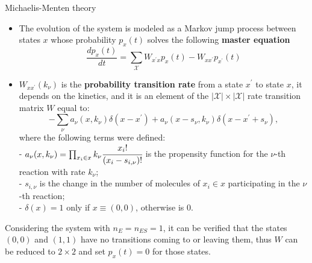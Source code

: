 \documentclass[final]{beamer}
\newlength{\colwidth}
\begin{document}
\begin{frame}[t]
\begin{columns}[t]
\begin{column}{\colwidth}
\begin{block}{Michaelis-Menten theory}
\begin{itemize}
\justifying
\item The evolution of the system is modeled as a Markov jump process between states $x$ whose probability $p_x(t)$ solves the following {\bf master equation}\cite{van2007stochastic,GILLESPIE1976403}
%
\begin{equation}
\frac{dp_{x}(t)}{dt} = \sum_{\mathcal{X}} W_{x^\prime x} p_{x}(t) -  W_{x x^\prime}p_{x^\prime}(t) \label{eq CME}
\end{equation}
\item $W_{x x^\prime }(k_\nu)$ is the {\bf probability transition rate} from a state $x^\prime$ to state $x$, it depends on the kinetics, and it is an element of the $|\mathcal{X}|\times|\mathcal{X}|$ rate transition matrix $W$ equal to\cite{Munsky_2006}:
\begin{equation*}
-\sum_\nu a_\nu({x},k_\nu) \delta(x - x^\prime) + a_\nu({x} - s_\nu,k_\nu) \delta(x - x^\prime + s_\nu),
\end{equation*}
\vskip-20pt
where the following terms were defined:\\

- $a_\nu({x},k_\nu) = \prod_{x_i \in x} k_\nu \cfrac{{x_i}!}{({x}_{i} - s_{i,\nu})!}$ is the propensity function for the $\nu$-th reaction with rate $k_\nu$;\\

- $s_{i,\nu} $ is the change in the number of molecules of $x_i \in x$ participating in the $\nu$-th reaction;\\
- $\delta(x) = 1$ only if $x \equiv (0,0)$, otherwise is $0$.
%
\end{itemize}
%

Considering the system with $n_E=n_{ES}=1$, it can be verified that the states $(0,0)$ and $(1,1)$ have no transitions coming to or leaving them, thus $W$ can be reduced to $2 \times 2$ and set $p_x(t) = 0$ for those states. 
\end{block}



\end{column}


\end{columns}
\end{frame}
\end{document}
